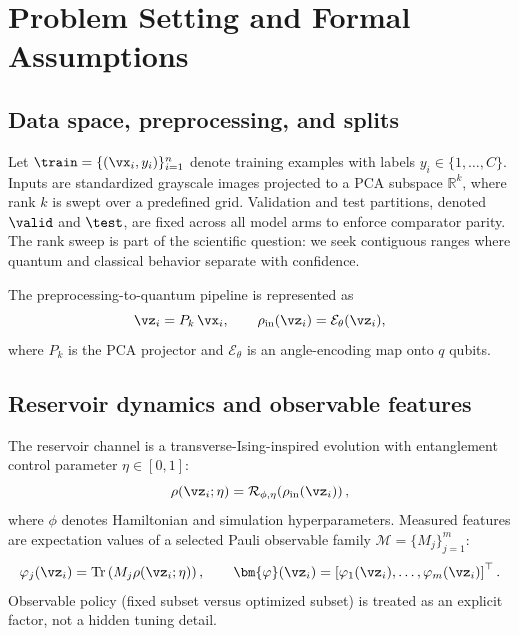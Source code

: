 \section{Problem Setting and Formal Assumptions}\label{sec:problem}
\subsection{Data space, preprocessing, and splits}
Let $\train=\{(\vx_i,y_i)\}_{i=1}^n$ denote training examples with labels $y_i\in\{1,\dots,C\}$. Inputs are standardized grayscale images projected to a PCA subspace $\mathbb{R}^{k}$, where rank $k$ is swept over a predefined grid. Validation and test partitions, denoted $\valid$ and $\test$, are fixed across all model arms to enforce comparator parity. The rank sweep is part of the scientific question: we seek contiguous ranges where quantum and classical behavior separate with confidence.

The preprocessing-to-quantum pipeline is represented as
\begin{equation}
\vz_i = P_k\,\vx_i, \qquad \rho_{\text{in}}(\vz_i)=\mathcal{E}_{\theta}(\vz_i),
\label{eq:encoding}
\end{equation}
where $P_k$ is the PCA projector and $\mathcal{E}_{\theta}$ is an angle-encoding map onto $q$ qubits.

\subsection{Reservoir dynamics and observable features}
The reservoir channel is a transverse-Ising-inspired evolution with entanglement control parameter $\eta\in[0,1]$:
\begin{equation}
\rho(\vz_i;\eta)=\mathcal{R}_{\phi,\eta}\!\left(\rho_{\text{in}}(\vz_i)\right),
\label{eq:reservoir}
\end{equation}
where $\phi$ denotes Hamiltonian and simulation hyperparameters. Measured features are expectation values of a selected Pauli observable family $\mathcal{M}=\{M_j\}_{j=1}^{m}$:
\begin{equation}
\varphi_j(\vz_i)=\mathrm{Tr}\left(M_j\rho(\vz_i;\eta)\right), \qquad
\bm{\varphi}(\vz_i)=\left[\varphi_1(\vz_i),\dots,\varphi_m(\vz_i)\right]^\top.
\label{eq:featuremap}
\end{equation}
Observable policy (fixed subset versus optimized subset) is treated as an explicit factor, not a hidden tuning detail.

